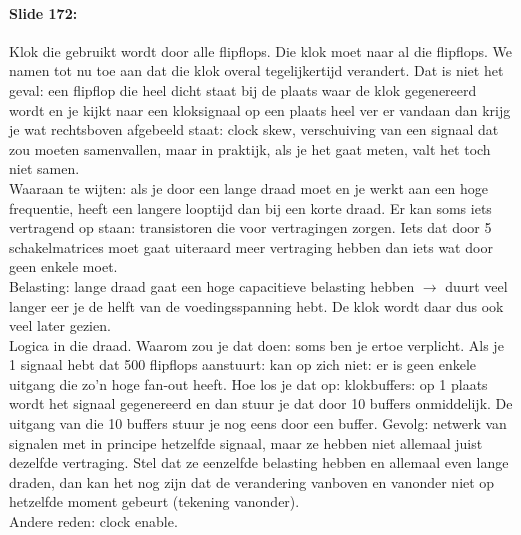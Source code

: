 \documentclass[10pt,a4paper]{book}
\begin{document}
\paragraph{Slide 172:} Klok die gebruikt wordt door alle flipflops. Die klok moet naar al die flipflops. We namen tot nu toe aan dat die klok overal tegelijkertijd verandert. Dat is niet het geval: een flipflop die heel dicht staat bij de plaats waar de klok gegenereerd wordt en je kijkt naar een kloksignaal op een plaats heel ver er vandaan dan krijg je wat rechtsboven afgebeeld staat: clock skew, verschuiving van een signaal dat zou moeten samenvallen, maar in praktijk, als je het gaat meten, valt het toch niet samen.\\
Waaraan te wijten: als je door een lange draad moet en je werkt aan een hoge frequentie, heeft een langere looptijd dan bij een korte draad. Er kan soms iets vertragend op staan: transistoren die voor vertragingen zorgen. Iets dat door 5 schakelmatrices moet gaat uiteraard meer vertraging hebben dan iets wat door geen enkele moet.\\
Belasting: lange draad gaat een hoge capacitieve belasting hebben $\rightarrow$ duurt veel langer eer je de helft van de voedingsspanning hebt. De klok wordt daar dus ook veel later gezien.\\
Logica in die draad. Waarom zou je dat doen: soms ben je ertoe verplicht. Als je 1 signaal hebt dat 500 flipflops aanstuurt: kan op zich niet: er is geen enkele uitgang die zo'n hoge fan-out heeft. Hoe los je dat op: klokbuffers: op 1 plaats wordt het signaal gegenereerd en dan stuur je dat door 10 buffers onmiddelijk. De uitgang van die 10 buffers stuur je nog eens door een buffer. Gevolg: netwerk van signalen met in principe hetzelfde signaal, maar ze hebben niet allemaal juist dezelfde vertraging. Stel dat ze eenzelfde belasting hebben en allemaal even lange draden, dan kan het nog zijn dat de verandering vanboven en vanonder niet op hetzelfde moment gebeurt (tekening vanonder).\\
Andere reden: clock enable.
\end{document}

